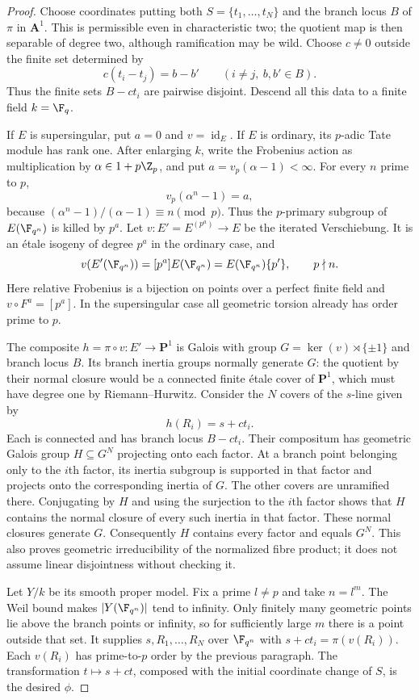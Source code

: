 \begin{proof}
Choose coordinates putting both $S=\{t_1,\ldots,t_N\}$ and the
branch locus $B$ of $\pi$ in $\mathbf A^1$. This is permissible even
in characteristic two; the quotient map is then separable of degree
two, although ramification may be wild. Choose $c\ne0$ outside the
finite set determined by
\[
 c(t_i-t_j)=b-b'\qquad(i\ne j,\ b,b'\in B).
\]
Thus the finite sets $B-ct_i$ are pairwise disjoint. Descend all this
data to a finite field $k=\F_q$.

If $E$ is supersingular, put $a=0$ and $v=\operatorname{id}_E$.
If $E$ is ordinary, its $p$-adic Tate module has rank one. After
enlarging $k$, write the Frobenius action as multiplication by
$\alpha\in1+p\Z_p$, and put $a=v_p(\alpha-1)<\infty$.
For every $n$ prime to $p$,
\[
 v_p(\alpha^n-1)=a,
\]
because $(\alpha^n-1)/(\alpha-1)\equiv n\pmod p$.
Thus the $p$-primary subgroup of $E(\F_{q^n})$ is killed by $p^a$.
Let $v:E'=E^{(p^a)}\to E$ be the iterated Verschiebung. It is an
\'etale isogeny of degree $p^a$ in the ordinary case, and
\[
 v(E'(\F_{q^n}))=[p^a]E(\F_{q^n})
                 =E(\F_{q^n})\{p'\},\qquad p\nmid n.
\]
Here relative Frobenius is a bijection on points over a perfect
finite field and $v\circ F^a=[p^a]$. In the supersingular case all
geometric torsion already has order prime to $p$.

The composite $h=\pi\circ v:E'\to\mathbf P^1$ is Galois with
group $G=\ker(v)\rtimes\{\pm1\}$ and branch locus $B$.
Its branch inertia groups normally generate $G$: the quotient by
their normal closure would be a connected finite \'etale cover of
$\mathbf P^1$, which must have degree one by Riemann--Hurwitz.
Consider the $N$ covers of the $s$-line given by
\[
 h(R_i)=s+ct_i.
\]
Each is connected and has branch locus $B-ct_i$. Their compositum
has geometric Galois group $H\subseteq G^N$ projecting onto each
factor. At a branch point belonging only to the $i$th factor, its
inertia subgroup is supported in that factor and projects onto the
corresponding inertia of $G$. The other covers are unramified there.
Conjugating by $H$ and using the surjection to the $i$th factor shows
that $H$ contains the normal closure of every such inertia in that
factor. These normal closures generate $G$. Consequently $H$ contains
every factor and equals $G^N$. This also proves geometric
irreducibility of the normalized fibre product; it does not assume
linear disjointness without checking it.

Let $Y/k$ be its smooth proper model. Fix a prime $l\ne p$ and take
$n=l^m$. The Weil bound makes $|Y(\F_{q^n})|$ tend to infinity.
Only finitely many geometric points lie above the branch points or
infinity, so for sufficiently large $m$ there is a point outside that
set. It supplies $s,R_1,\ldots,R_N$ over $\F_{q^n}$ with
$s+ct_i=\pi(v(R_i))$. Each $v(R_i)$ has prime-to-$p$ order by the
previous paragraph. The transformation $t\mapsto s+ct$, composed
with the initial coordinate change of $S$, is the desired $\phi$.
\end{proof}

